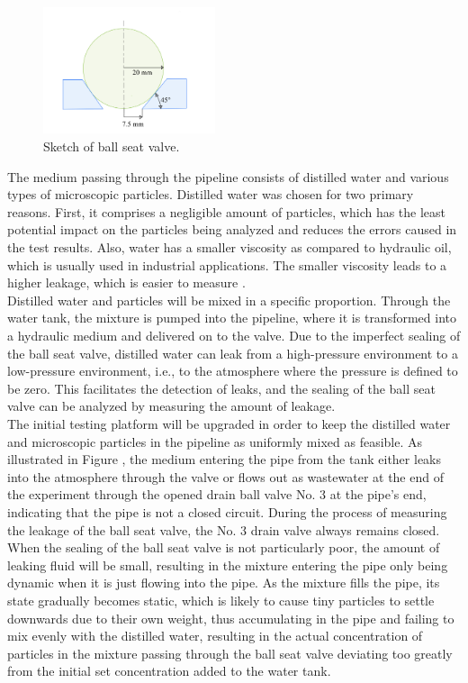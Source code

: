 \begin{figure}[htbp]
    \centering
    \includegraphics[width=0.45\textwidth]{figures/BallSeatValve/ballseatvalve.jpg}
    \caption{Sketch of ball seat valve.}
    \label{fig:ballseatvalve}
\end{figure}


The medium passing through the pipeline consists of distilled water and various types of microscopic particles. Distilled water
was chosen for two primary reasons. First, it comprises a negligible amount of particles,
which has the least potential impact on the particles being analyzed and reduces the 
errors caused in the test results. Also, water has a smaller viscosity as compared to
hydraulic oil, which is usually used in industrial applications. 
The smaller viscosity leads to a higher leakage, which is easier to measure \cite{fischer2021influence}.\\


Distilled water and particles will be mixed in a specific proportion. 
Through the water tank, the mixture is pumped into the pipeline, where 
it is transformed into a hydraulic medium and delivered on to the valve. 
Due to the imperfect sealing of the ball seat valve, distilled water can leak 
from a high-pressure environment to a low-pressure environment, i.e., to the 
atmosphere where the pressure is defined to be zero. This facilitates the detection of leaks, 
and the sealing of the ball seat valve can be analyzed by measuring the amount of leakage.\\

The initial testing platform will be upgraded in order to keep the distilled water and microscopic
particles in the pipeline as uniformly mixed as feasible. As illustrated in Figure , 
the medium 
entering the pipe from the tank either leaks into the atmosphere through the valve or flows out as 
wastewater at the end of the experiment through the opened drain ball valve No. 3 at the pipe's end, 
indicating that the pipe is not a closed circuit. During the process of measuring the leakage of the 
ball seat valve, the No. 3 drain valve always remains closed. When the sealing of the ball seat valve 
is not particularly poor, the amount of leaking fluid will be small, resulting in the mixture entering 
the pipe only being dynamic when it is just flowing into the pipe. As the mixture fills the pipe, its 
state gradually becomes static, which is likely to cause tiny particles to settle downwards due to their
own weight, thus accumulating in the pipe and failing to mix evenly with the distilled water, resulting 
in the actual concentration of particles in the mixture passing through the ball seat valve 
deviating too greatly from the initial set concentration added to the water tank. 

